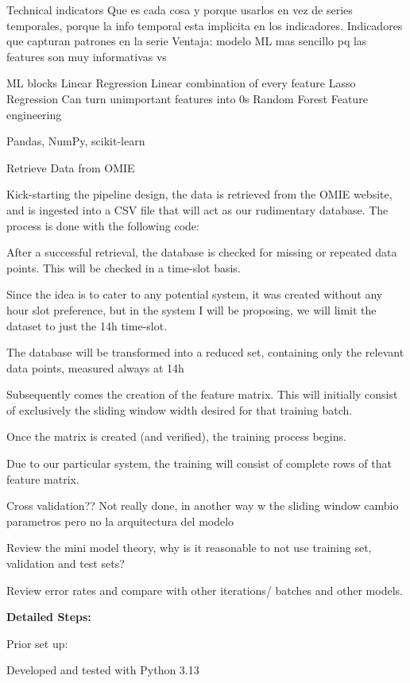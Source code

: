 \documentclass[12pt]{report} %
\begin{document}
Technical indicators
Que es cada cosa y porque usarlos en vez de series temporales, porque la info temporal esta implicita en los indicadores.
Indicadores que capturan patrones en la serie
Ventaja: modelo ML mas sencillo pq las features son muy informativas vs

ML blocks
    Linear Regression
        Linear combination of every feature
    Lasso Regression
        Can turn unimportant features into 0s
    Random Forest
        Feature engineering

Pandas, NumPy, scikit-learn


Retrieve Data from OMIE

Kick-starting the pipeline design, the data is retrieved from the OMIE website, and is ingested into a CSV file that will act as our rudimentary database. The process is done with the following code:

After a successful retrieval, the database is checked for missing or repeated data points. This will be checked in a time-slot basis.

Since the idea is to cater to any potential system, it was created without any hour slot preference, but in the system I will be proposing, we will limit the dataset to just the 14h time-slot.

The database will be transformed into a reduced set, containing only the relevant data points, measured always at 14h

Subsequently comes the creation of the feature matrix. This will initially consist of exclusively the sliding window width desired for that training batch.

Once the matrix is created (and verified), the training process begins.

Due to our particular system, the training will consist of complete rows of that feature matrix.

Cross validation?? Not really done, in another way w the sliding window
cambio parametros pero no la arquitectura del modelo

Review the mini model theory, why is it reasonable to not use training set, validation and test sets?

Review error rates and compare with other iterations/ batches and other models.

\noindent \textbf{Detailed Steps:}

Prior set up:

Developed and tested with Python 3.13 \cite{python}
\end{document}
